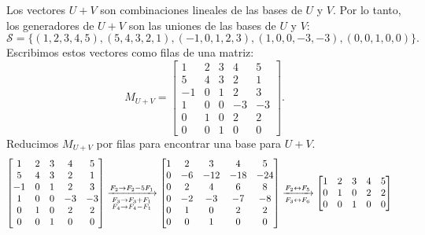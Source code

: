 \begin{enumerate}[label=\color{red}\textbf{\arabic*)}]
\begin{enumerate}[label=Paso \arabic*:]
        Los vectores  $U+V$ son combinaciones lineales de las bases de  $U$ y $V$. Por lo tanto, los generadores de $U+V$ son las uniones de las bases de  $U$ y $V$:  \[
        \mathcal{S}=\{(1,2,3,4,5),(5,4,3,2,1),(-1,0,1,2,3),(1,0,0,-3,-3),(0,0,1,0,0)\} .
        \] 
        Escribimos estos vectores como filas de una matriz: \[
        M_{U+V}=
        \begin{bmatrix} 
            1 & 2 & 3 & 4 & 5\\
            5 & 4 & 3 & 2 & 1\\
            -1 & 0 & 1 & 2 & 3\\
            1 & 0 & 0 & -3 & -3\\
            0 & 1 & 0 & 2 & 2\\
            0 & 0 & 1 & 0 & 0
        \end{bmatrix} .
        \] 
        Reducimos $M_{U+V}$ por filas para encontrar una base para $U+V$.  \[
        \begin{aligned}
        \begin{bmatrix} 
            1 & 2 & 3 & 4 & 5\\
            5 & 4 & 3 & 2 & 1\\
            -1 & 0 & 1 & 2 & 3\\
            1 & 0 & 0 & -3 & -3\\
            0 & 1 & 0 & 2 & 2\\
            0 & 0 & 1 & 0 & 0
        \end{bmatrix}&\xrightarrow[\begin{subarray}{l}
            F_3\to F_3+F_1\\
            F_4\to F_4-F_1
        \end{subarray}]{F_2\to F_2-5F_1}
        \begin{bmatrix} 
            1 & 2 & 3 & 4 & 5 \\
            0 & -6 & -12 & -18 & -24\\
            0 & 2 & 4 & 6 & 8\\
            0 & -2 & -3 & -7 & -8\\
            0 & 1 & 0 & 2 & 2\\
            0 & 0 & 1 & 0 & 0
        \end{bmatrix}\xrightarrow[F_3\leftrightarrow F_6]{F_2\leftrightarrow F_5} \begin{bmatrix} 
            1 & 2 & 3 & 4 & 5\\
            0 & 1 & 0 & 2 & 2\\
            0 & 0 & 1 & 0 & 0\\

\end{bmatrix}
\end{aligned}\]
\end{enumerate}
\end{enumerate}

